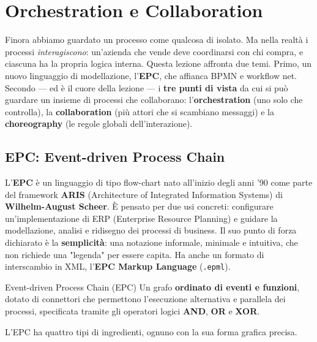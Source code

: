 \chapter{\texorpdfstring{Orchestration e Collaboration}{Orchestration e Collaboration}}
\label{ch:06}

Finora abbiamo guardato un processo come qualcosa di isolato. Ma nella realtà i processi \emph{interagiscono}: un'azienda che vende deve coordinarsi con chi compra, e ciascuna ha la propria logica interna. Questa lezione affronta due temi. Primo, un nuovo linguaggio di modellazione, l'\textbf{EPC}, che affianca BPMN e workflow net. Secondo — ed è il cuore della lezione — i \textbf{tre punti di vista} da cui si può guardare un insieme di processi che collaborano: l'\textbf{orchestration} (uno solo che controlla), la \textbf{collaboration} (più attori che si scambiano messaggi) e la \textbf{choreography} (le regole globali dell'interazione).

\section{\texorpdfstring{EPC: Event-driven Process Chain}{EPC: Event-driven Process Chain}}

L'\textbf{EPC} è un linguaggio di tipo flow-chart nato all'inizio degli anni '90 come parte del framework \textbf{ARIS} (Architecture of Integrated Information Systems) di \textbf{Wilhelm-August Scheer}. È pensato per due usi concreti: configurare un'implementazione di ERP (Enterprise Resource Planning) e guidare la modellazione, analisi e ridisegno dei processi di business. Il suo punto di forza dichiarato è la \textbf{semplicità}: una notazione informale, minimale e intuitiva, che non richiede una "legenda" per essere capita. Ha anche un formato di interscambio in XML, l'\textbf{EPC Markup Language} (\texttt{.epml}).

\begin{boxdefinition}{Event-driven Process Chain (EPC)}
Un grafo \textbf{ordinato di eventi e funzioni}, dotato di connettori che permettono l'esecuzione alternativa e parallela dei processi, specificata tramite gli operatori logici \textbf{AND}, \textbf{OR} e \textbf{XOR}.
\end{boxdefinition}

L'EPC ha quattro tipi di ingredienti, ognuno con la sua forma grafica precisa.

